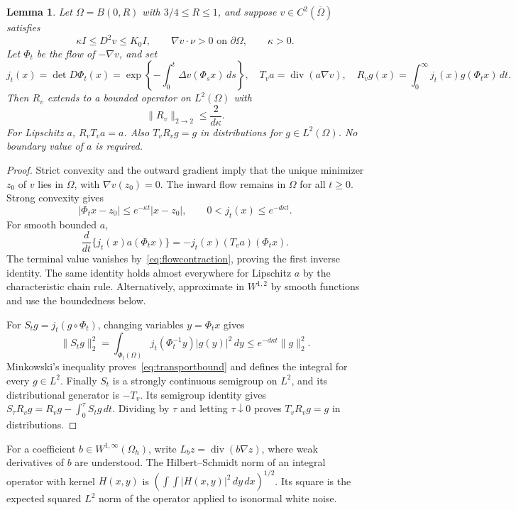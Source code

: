 \documentclass[11pt]{article}
\newtheorem{lemma}[theorem]{Lemma}
\theoremstyle{remark}
\newcommand{\diver}{\operatorname{div}}
\newcommand{\norm}[1]{\lVert #1\rVert}
\newcommand{\abs}[1]{\lvert #1\rvert}
\begin{document}
\begin{lemma}\label{lem:transport}
Let $\Omega=B(0,R)$ with $3/4\le R\le1$, and suppose $v\in C^2(\overline\Omega)$ satisfies
\begin{equation}\label{eq:flowgeometry}
 \kappa I\le D^2v\le K_0I,\qquad \nabla v\cdot\nu>0\text{ on }\partial\Omega,
 \qquad \kappa>0.
\end{equation}
Let $\Phi_t$ be the flow of $-\nabla v$, and set
\[
 j_t(x)=\det D\Phi_t(x)
 =\exp\left\{-\int_0^t\Delta v(\Phi_sx)\,ds\right\},
 \quad T_va=\diver(a\nabla v),
 \quad R_vg(x)=\int_0^\infty j_t(x)g(\Phi_tx)\,dt.
\]
Then $R_v$ extends to a bounded operator on $L^2(\Omega)$ with
\begin{equation}\label{eq:transportbound}
 \norm{R_v}_{2\to2}\le\frac{2}{d\kappa}.
\end{equation}
For Lipschitz $a$, $R_vT_va=a$. Also $T_vR_vg=g$ in distributions for $g\in L^2(\Omega)$. No boundary value of $a$ is required.
\end{lemma}
\begin{proof}
Strict convexity and the outward gradient imply that the unique minimizer $z_0$ of $v$ lies in $\Omega$, with $\nabla v(z_0)=0$. The inward flow remains in $\Omega$ for all $t\ge0$. Strong convexity gives
\begin{equation}\label{eq:flowcontraction}
 \abs{\Phi_tx-z_0}\le e^{-\kappa t}\abs{x-z_0},
 \qquad 0<j_t(x)\le e^{-d\kappa t}.
\end{equation}
For smooth bounded $a$,
\[
 \frac{d}{dt}\{j_t(x)a(\Phi_tx)\}=-j_t(x)(T_va)(\Phi_tx).
\]
The terminal value vanishes by~\eqref{eq:flowcontraction}, proving the first inverse identity. The same identity holds almost everywhere for Lipschitz $a$ by the characteristic chain rule. Alternatively, approximate in $W^{1,2}$ by smooth functions and use the boundedness below.

For $S_tg=j_t(g\circ\Phi_t)$, changing variables $y=\Phi_tx$ gives
\[
 \norm{S_tg}_2^2
 =\int_{\Phi_t(\Omega)}j_t(\Phi_t^{-1}y)\abs{g(y)}^2\,dy
 \le e^{-d\kappa t}\norm g_2^2.
\]
Minkowski's inequality proves~\eqref{eq:transportbound} and defines the integral for every $g\in L^2$. Finally $S_t$ is a strongly continuous semigroup on $L^2$, and its distributional generator is $-T_v$. Its semigroup identity gives
$S_\tau R_vg=R_vg-\int_0^\tau S_tg\,dt$.
Dividing by $\tau$ and letting $\tau\downarrow0$ proves $T_vR_vg=g$ in distributions.
\end{proof}

For a coefficient $b\in W^{1,\infty}(\Omega_h)$, write $L_bz=\diver(b\nabla z)$, where weak derivatives of $b$ are understood. The Hilbert--Schmidt norm of an integral operator with kernel $H(x,y)$ is $(\int\int\abs{H(x,y)}^2\,dy\,dx)^{1/2}$. Its square is the expected squared $L^2$ norm of the operator applied to isonormal white noise.
\end{document}
